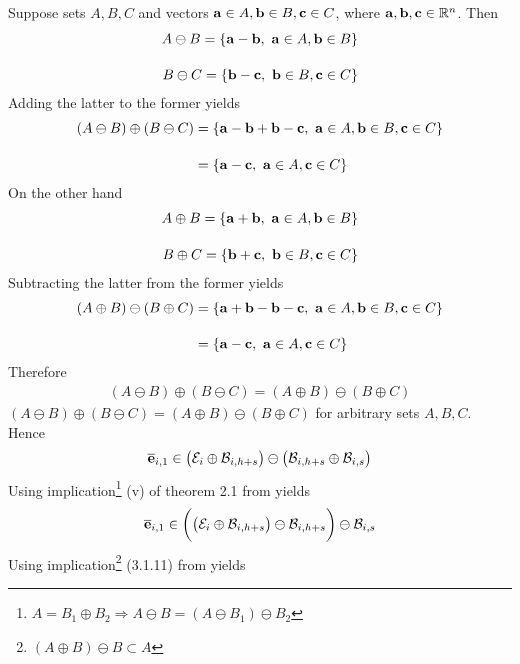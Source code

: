 \begin{gg_box}
{  Suppose sets $A,B,C$ and vectors
  $\bm{\mathbf{a}} \in A, \bm{\mathbf{b}} \in B, \bm{\mathbf{c}} \in C$, where
  $\bm{\mathbf{a}}, \bm{\mathbf{b}}, \bm{\mathbf{c}} \in \mathbb{R}^n$. Then
\begin{align}
  A \ominus B = \{\bm{\mathbf{a}} - \bm{\mathbf{b}},\ \bm{\mathbf{a}} \in A, \bm{\mathbf{b}} \in B\} \\[2.5ex]
  B \ominus C = \{\bm{\mathbf{b}} - \bm{\mathbf{c}},\ \bm{\mathbf{b}} \in B, \bm{\mathbf{c}} \in C\}
\end{align}
Adding the latter to the former yields
\begin{align}
  (A \ominus B) \oplus (B \ominus C)
    &= \{\bm{\mathbf{a}} - \bm{\mathbf{b}} + \bm{\mathbf{b}} - \bm{\mathbf{c}},\ \bm{\mathbf{a}} \in A, \bm{\mathbf{b}} \in B, \bm{\mathbf{c}} \in C\} \\[2.5ex]
    &= \{\bm{\mathbf{a}} - \bm{\mathbf{c}},\ \bm{\mathbf{a}} \in A, \bm{\mathbf{c}} \in C\}
\end{align}
On the other hand
\begin{align}
  A \oplus B = \{\bm{\mathbf{a}} + \bm{\mathbf{b}},\ \bm{\mathbf{a}} \in A, \bm{\mathbf{b}} \in B\} \\[2.5ex]
  B \oplus C = \{\bm{\mathbf{b}} + \bm{\mathbf{c}},\ \bm{\mathbf{b}} \in B, \bm{\mathbf{c}} \in C\}
\end{align}
Subtracting the latter from the former yields
\begin{align}
  (A \oplus B) \ominus (B \oplus C) &= \{\bm{\mathbf{a}} + \bm{\mathbf{b}} - \bm{\mathbf{b}} - \bm{\mathbf{c}},\ \bm{\mathbf{a}} \in A, \bm{\mathbf{b}} \in B, \bm{\mathbf{c}} \in C\} \\[2.5ex]
    &= \{\bm{\mathbf{a}} - \bm{\mathbf{c}},\ \bm{\mathbf{a}} \in A, \bm{\mathbf{c}} \in C\}
\end{align}
Therefore
\begin{align}
  (A \ominus B) \oplus (B \ominus C) = (A \oplus B) \ominus (B \oplus C)
\end{align}
}
$(A \ominus B) \oplus (B \ominus C) = (A \oplus B) \ominus (B \oplus C)$
for arbitrary sets $A,B,C$. Hence
\begin{align}
  \overline{\bm{\mathbf{e}}}_{i,1} \in \big(\mathcal{E}_i \oplus \mathcal{B}_{i,h+s}\big) \ominus \big(\mathcal{B}_{i, h+s} \oplus \mathcal{B}_{i,s}\big)
\end{align}
Using implication\footnote{
$A = B_1 \oplus B_2 \Rightarrow A \ominus B = (A \ominus B_1) \ominus B_2$}
(v) of theorem 2.1 from \cite{kolmanovsky} yields
\begin{align}
  \overline{\bm{\mathbf{e}}}_{i,1} \in \bigg(\big(\mathcal{E}_i \oplus \mathcal{B}_{i,h+s}\big) \ominus \mathcal{B}_{i, h+s}\bigg) \ominus \mathcal{B}_{i,s}
\end{align}
Using implication\footnote{$(A \oplus B) \ominus B \subset A$}
(3.1.11) from \cite{schneider_2013} yields

\end{gg_box}
